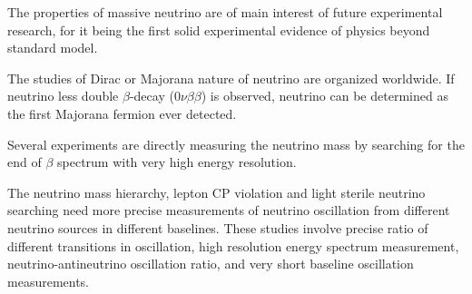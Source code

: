 \label{ch1sec7}
    
    The properties of massive neutrino are of main interest of future experimental research, for it being the first solid experimental evidence of physics beyond standard model.
    
    The studies of Dirac or Majorana nature of neutrino are organized worldwide. 
    If neutrino less double $\beta$-decay ($0\nu\beta\beta$) is observed, neutrino can be determined as the first Majorana fermion ever detected.
    
    Several experiments are directly measuring the neutrino mass by searching for the end of $\beta$ spectrum with very high energy resolution. 
    
    The neutrino mass hierarchy, lepton CP violation and light sterile neutrino searching need more precise measurements of neutrino oscillation from different neutrino sources in different baselines. 
    These studies involve precise ratio of different transitions in oscillation, high resolution energy spectrum measurement, neutrino-antineutrino oscillation ratio, and very short baseline oscillation measurements.